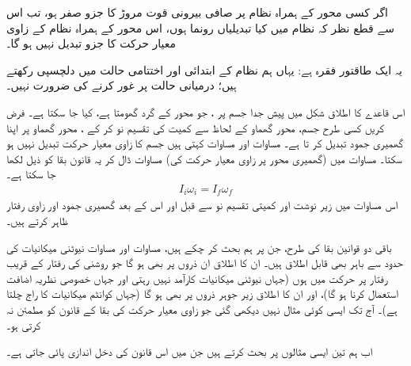 اگر کسی محور  کے ہمراہ  نظام پر صافی بیرونی قوت مروڑ کا جزو صفر ہو،  تب اس سے قطع نظر کہ نظام میں کیا تبدیلیاں رونما ہوں، اس محور  کے ہمراہ نظام کے زاوی معیار حرکت  کا جزو  تبدیل نہیں ہو گا۔

یہ ایک طاقتور  فقرہ ہے: یہاں ہم نظام کے ابتدائی اور اختتامی حالت میں دلچسپی رکھتے ہیں؛  درمیانی  حالت  پر غور کرنے کی ضرورت نہیں۔

اس   قاعدے کا اطلاق شکل  میں پیش  جدا جسم پر  ، جو  محور  کے گرد گھومتا ہے،  کیا جا سکتا ہے۔ فرض کریں کسی طرح  جسم، محور گھماو کے لحاظ سے  کمیت کی تقسیم نو کر کے ، محور گھماو پر اپنا گھمیری جمود تبدیل کر تا ہے۔ مساوات  اور مساوات  کہتی ہیں جسم کا  زاوی معیار حرکت تبدیل نہیں ہو سکتا۔ مساوات  میں (گھمیری محور پر زاوی معیار حرکت کی) مساوات     ڈال کر   یہ  قانون بقا کو ذیل لکھا جا سکتا ہے۔
\begin{align}\label{مساوات_لڑھکاو_اول_آخر}
I_i\omega_i=I_f\omega_f
\end{align}
اس مساوات میں زیر نوشت  اور  کمیتی تقسیم نو سے قبل اور اس کے بعد گھمیری جمود اور زاوی رفتار  ظاہر کرتے ہیں۔

باقی دو قوانین بقا کی طرح، جن پر ہم بحث کر چکے ہیں،  مساوات  اور مساوات  نیوٹنی  میکانیات  کی حدود سے باہر بھی قابل اطلاق ہیں۔ ان کا اطلاق ان ذروں پر بھی ہو گا جو روشنی کی رفتار کے قریب رفتار پر حرکت میں ہوں (جہاں نیوٹنی میکانیات کارآمد نہیں رہتی اور جہاں   خصوصی نظریہ  اضافت استعمال کرنا  ہو گا)، اور ان کا اطلاق  زیر جوہر ذروں پر بھی ہو گا (جہاں کوانٹم میکانیات کا راج چلتا ہے)۔ آج تک ایسی کوئی مثال نہیں دیکھی گئی جو زاوی معیار حرکت کی بقا  کے قانون کو مطمئن نہ کرتی ہو۔

اب ہم  تین  ایسی مثالوں  پر بحث کرتے ہیں جن میں  اس  قانون  کی  دخل اندازی  پائی جاتی ہے۔

